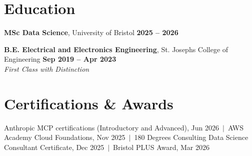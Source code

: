 \documentclass[a4paper,10pt]{article}
\begin{document}
\section{Education}
\textbf{MSc Data Science}, University of Bristol \hfill \textbf{2025 – 2026}\par
\vspace{2pt}
\textbf{B.E. Electrical and Electronics Engineering}, St. Joseph\textquotesingle{}s College of Engineering \hfill \textbf{Sep 2019 – Apr 2023}\\ \textit{First Class with Distinction}\par

\section{Certifications \& Awards}
Anthropic MCP certifications (Introductory and Advanced), Jun 2026 \,$|$\, AWS Academy Cloud Foundations, Nov 2025 \,$|$\, 180 Degrees Consulting Data Science Consultant Certificate, Dec 2025 \,$|$\, Bristol PLUS Award, Mar 2026
\end{document}
